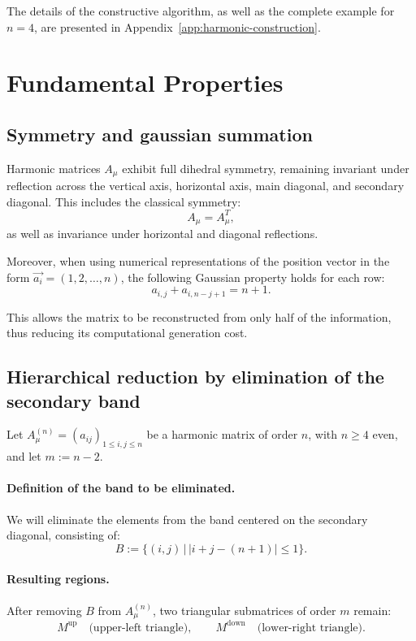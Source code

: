 \documentclass{article}
\begin{document}
\medskip
The details of the constructive algorithm, as well as the complete example for \(n = 4\), are presented in Appendix~\ref{app:harmonic-construction}.

\section{Fundamental Properties}

\subsection{Symmetry and gaussian summation}

Harmonic matrices \(A_\mu\) exhibit full dihedral symmetry, remaining invariant under reflection across the vertical axis, horizontal axis, main diagonal, and secondary diagonal.
This includes the classical symmetry:
\[
A_\mu = A_\mu^T,
\]
as well as invariance under horizontal and diagonal reflections.

\medskip

Moreover, when using numerical representations of the position vector in the form \(\vec{a_i} = (1, 2, \dots, n)\), the following Gaussian property holds for each row:
\[
a_{i,j} + a_{i,n-j+1} = n + 1.
\]

This allows the matrix to be reconstructed from only half of the information, thus reducing its computational generation cost.

\subsection{Hierarchical reduction by elimination of the secondary band}
\label{sec:reduccion-banda-diagonal}

Let \(A_\mu^{(n)} = (a_{ij})_{1 \le i,j \le n}\) be a harmonic matrix of order \(n\), with \(n \ge 4\) even, and let \(m := n - 2\).

\paragraph{Definition of the band to be eliminated.}
We will eliminate the elements from the band centered on the secondary diagonal, consisting of:
\[
\boxed{B := \bigl\{(i,j)\,\bigl|\,|i + j - (n + 1)| \le 1\bigr\}}.
\tag{1}
\]

\paragraph{Resulting regions.}
After removing \(B\) from \(A_\mu^{(n)}\), two triangular submatrices of order \(m\) remain:
\[
M^{\text{up}}\quad\text{(upper-left triangle)},\qquad
M^{\text{down}}\quad\text{(lower-right triangle)}.
\]
\end{document}
